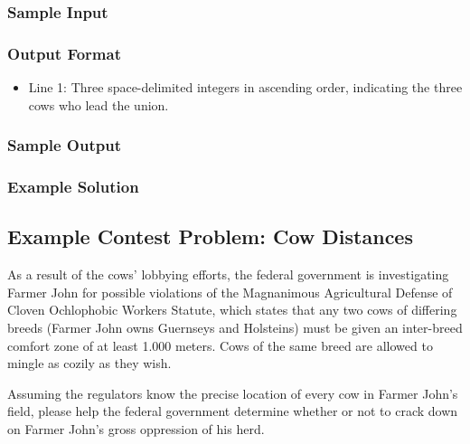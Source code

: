 \subsubsection{Sample Input}

\subsubsection{Output Format}
\begin{itemize}
	\item Line 1: Three space-delimited integers in ascending order, indicating the three cows who lead the union.
\end{itemize}

\subsubsection{Sample Output}

\subsubsection{Example Solution}

\subsection{Example Contest Problem: Cow Distances}
As a result of the cows' lobbying efforts, the federal government is investigating Farmer John for possible violations of the Magnanimous Agricultural Defense of Cloven Ochlophobic Workers Statute, which states that any two cows of differing breeds (Farmer John owns Guernseys and Holsteins) must be given an inter-breed comfort zone of at least 1.000 meters.
Cows of the same breed are allowed to mingle as cozily as they wish.

Assuming the regulators know the precise location of every cow in Farmer John's field, please help the federal government determine whether or not to crack down on Farmer John's gross oppression of his herd.

